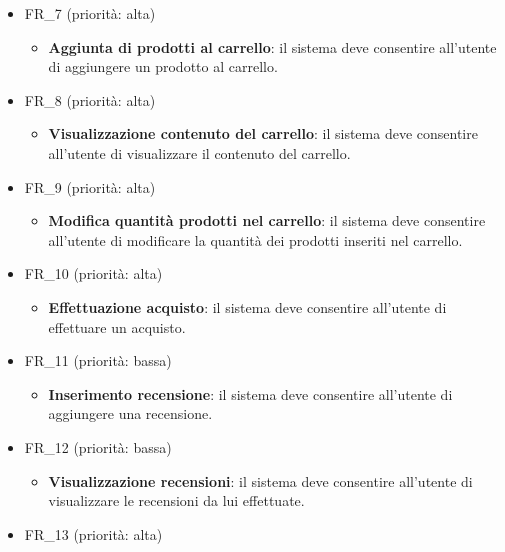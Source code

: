 \documentclass[12pt, a4paper, oneside]{book}
\begin{document}
\begin{itemize}
\begin{itemize}
                \end{itemize}
            \item FR\_7 (priorità: alta)
               \begin{itemize}
                   \item \textbf{Aggiunta di prodotti al carrello}: il sistema deve consentire all'utente di aggiungere un prodotto al carrello.
                \end{itemize}
            \item FR\_8 (priorità: alta)
               \begin{itemize}
                   \item \textbf{Visualizzazione contenuto del carrello}: il sistema deve consentire all'utente di visualizzare il contenuto del carrello.
                \end{itemize}
            \item FR\_9 (priorità: alta)
               \begin{itemize}
                   \item \textbf{Modifica quantità prodotti nel carrello}: il sistema deve consentire all'utente di modificare la quantità dei prodotti inseriti nel carrello.
                \end{itemize}
            \item FR\_10 (priorità: alta)
               \begin{itemize}
                   \item \textbf{Effettuazione acquisto}: il sistema deve consentire all'utente di effettuare un acquisto.
                \end{itemize}
            \item FR\_11 (priorità: bassa)
               \begin{itemize}
                   \item \textbf{Inserimento recensione}: il sistema deve consentire all'utente di aggiungere una recensione.
                \end{itemize}
            \item FR\_12 (priorità: bassa)
               \begin{itemize}
                   \item \textbf{Visualizzazione recensioni}: il sistema deve consentire all'utente di visualizzare le recensioni da lui effettuate.
                \end{itemize}
            \item FR\_13 (priorità: alta)

\end{itemize}
\end{document}
